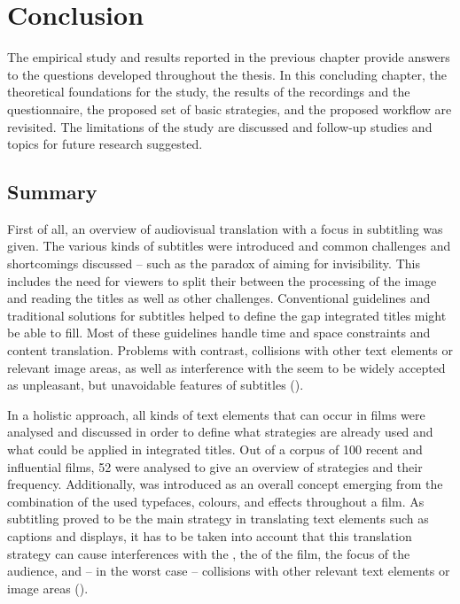 \chapter{Conclusion}\label{conclusion}
\largerpage
The empirical study and results reported in the previous chapter provide answers to the questions developed throughout the thesis. In this concluding chapter, the theoretical foundations for the study, the results of the  recordings and the questionnaire, the proposed set of basic  strategies, and the proposed workflow are revisited. The limitations of the study are discussed and follow-up studies and topics for future research suggested.

\section{Summary}\label{sec:9.1}

First of all, an overview of audiovisual translation with a focus in subtitling was given. The various kinds of subtitles were introduced and common challenges and shortcomings discussed – such as the paradox of aiming for invisibility. This includes the need for viewers to split their  between the processing of the image and reading the titles as well as other challenges. Conventional guidelines and traditional solutions for subtitles helped to define the gap integrated titles might be able to fill. Most of these guidelines handle time and space constraints and content translation. Problems with contrast, collisions with other text elements or relevant image areas, as well as interference with the  seem to be widely accepted as unpleasant, but unavoidable features of subtitles ().

In a holistic approach, all kinds of text elements that can occur in films were analysed and discussed in order to define what  strategies are already used and what could be applied in integrated titles. Out of a corpus of 100 recent and influential films, 52 were analysed to give an overview of  strategies and their frequency. Additionally,  was introduced as an overall concept emerging from the combination of the used typefaces, colours, and effects throughout a film. As subtitling proved to be the main strategy in translating text elements such as captions and displays, it has to be taken into account that this translation strategy can cause interferences with the , the  of the film, the focus of the audience, and – in the worst case – collisions with other relevant text elements or image areas ().

